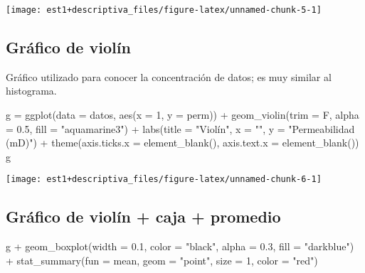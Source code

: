 \documentclass[
]{book}
\newenvironment{Shaded}{\begin{snugshade}}{\end{snugshade}}
\newcommand{\AttributeTok}[1]{\textcolor[rgb]{0.77,0.63,0.00}{#1}}
\newcommand{\DecValTok}[1]{\textcolor[rgb]{0.00,0.00,0.81}{#1}}
\newcommand{\FloatTok}[1]{\textcolor[rgb]{0.00,0.00,0.81}{#1}}
\newcommand{\FunctionTok}[1]{\textcolor[rgb]{0.00,0.00,0.00}{#1}}
\newcommand{\NormalTok}[1]{#1}
\newcommand{\OtherTok}[1]{\textcolor[rgb]{0.56,0.35,0.01}{#1}}
\newcommand{\SpecialCharTok}[1]{\textcolor[rgb]{0.00,0.00,0.00}{#1}}
\newcommand{\StringTok}[1]{\textcolor[rgb]{0.31,0.60,0.02}{#1}}
\theoremstyle{definition}
\theoremstyle{definition}
\theoremstyle{definition}
\theoremstyle{definition}
\theoremstyle{remark}
\begin{document}
\begin{center}\texttt{[image: est1+descriptiva\_files/figure-latex/unnamed-chunk-5-1]} \end{center}

\hypertarget{gruxe1fico-de-violuxedn}{%
\subsection*{Gráfico de violín}\label{gruxe1fico-de-violuxedn}}

Gráfico utilizado para conocer la concentración de datos; es muy similar al histograma.

\begin{Shaded}
\begin{Highlighting}[]
\NormalTok{g }\OtherTok{=} \FunctionTok{ggplot}\NormalTok{(}\AttributeTok{data =}\NormalTok{ datos, }\FunctionTok{aes}\NormalTok{(}\AttributeTok{x =} \DecValTok{1}\NormalTok{, }\AttributeTok{y =}\NormalTok{ perm)) }\SpecialCharTok{+} 
  \FunctionTok{geom\_violin}\NormalTok{(}\AttributeTok{trim =}\NormalTok{ F, }\AttributeTok{alpha =} \FloatTok{0.5}\NormalTok{, }\AttributeTok{fill =} \StringTok{"aquamarine3"}\NormalTok{) }\SpecialCharTok{+}
  \FunctionTok{labs}\NormalTok{(}\AttributeTok{title =} \StringTok{"Violín"}\NormalTok{, }\AttributeTok{x =} \StringTok{""}\NormalTok{, }\AttributeTok{y =} \StringTok{"Permeabilidad (mD)"}\NormalTok{) }\SpecialCharTok{+} 
  \FunctionTok{theme}\NormalTok{(}\AttributeTok{axis.ticks.x =} \FunctionTok{element\_blank}\NormalTok{(),}
        \AttributeTok{axis.text.x =} \FunctionTok{element\_blank}\NormalTok{())}
\NormalTok{g}
\end{Highlighting}
\end{Shaded}

\begin{center}\texttt{[image: est1+descriptiva\_files/figure-latex/unnamed-chunk-6-1]} \end{center}

\hypertarget{gruxe1fico-de-violuxedn-caja-promedio}{%
\subsection*{Gráfico de violín + caja + promedio}\label{gruxe1fico-de-violuxedn-caja-promedio}}

\begin{Shaded}
\begin{Highlighting}[]
\NormalTok{g }\SpecialCharTok{+} \FunctionTok{geom\_boxplot}\NormalTok{(}\AttributeTok{width =} \FloatTok{0.1}\NormalTok{, }\AttributeTok{color =} \StringTok{"black"}\NormalTok{,}
                 \AttributeTok{alpha =} \FloatTok{0.3}\NormalTok{, }\AttributeTok{fill =} \StringTok{"darkblue"}\NormalTok{)  }\SpecialCharTok{+}
  \FunctionTok{stat\_summary}\NormalTok{(}\AttributeTok{fun =}\NormalTok{ mean, }\AttributeTok{geom =} \StringTok{"point"}\NormalTok{,}
               \AttributeTok{size =} \DecValTok{1}\NormalTok{, }\AttributeTok{color =} \StringTok{"red"}\NormalTok{)}
\end{Highlighting}
\end{Shaded}
\end{document}
